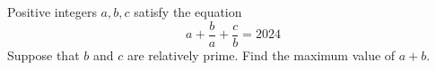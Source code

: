 Positive integers $a, b, c$ satisfy the equation \[a +\dfrac{b}{a}+\dfrac{c}{b}= 2024\]Suppose that $b$ and $c$ are relatively prime. Find the maximum value of $a + b$.
